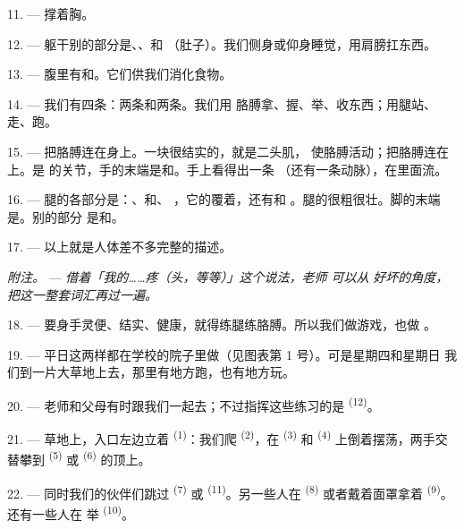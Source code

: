 11. --- 撑着胸。

12. --- 躯干别的部分是、、和
（肚子）。我们侧身或仰身睡觉，用肩膀扛东西。

13. --- 腹里有和。它们供我们消化食物。

\VUsaut{4.4mm}
\VUsaut{3.0mm}

14. --- 我们有四条：两条和两条。我们用
胳膊拿、握、举、收东西；用腿站、走、跑。

15. --- 把胳膊连在身上。一块很结实的，就是二头肌，
使胳膊活动；把胳膊连在上。是
的关节，手的末端是和。手上看得出一条
（还有一条动脉），在里面流。

16. --- 腿的各部分是：、和、
，它的覆着，还有和
。腿的很粗很壮。脚的末端是。别的部分
是和。

17. --- 以上就是人体差不多完整的描述。

\textit{附注。} --- \textit{借着「我的……疼（头，等等）」这个说法，老师
可以从} \textit{好坏的角度，把这一整套词汇再过一遍。}

\VUsaut{5.0mm}
\VUsaut{2.4mm}
\VUsaut{3.0mm}

18. --- 要身手灵便、结实、健康，就得练腿练胳膊。所以我们做游戏，也做
。

19. --- 平日这两样都在学校的院子里做（见图表第 1 号）。可是星期四和星期日
我们到一片大草地上去，那里有地方跑，也有地方玩。

20. --- 老师和父母有时跟我们一起去；不过指挥这些练习的是
 \textsuperscript{(12)}。

21. --- 草地上，入口左边立着 \textsuperscript{(1)}：我们爬
 \textsuperscript{(2)}，在 \textsuperscript{(3)} 和
 \textsuperscript{(4)} 上倒着摆荡，两手交替攀到
\textsuperscript{(5)} 或 \textsuperscript{(6)} 的顶上。

22. --- 同时我们的伙伴们跳过 \textsuperscript{(7)} 或
 \textsuperscript{(11)}。另一些人在 \textsuperscript{(8)}
或者戴着面罩拿着 \textsuperscript{(9)}。还有一些人在
举 \textsuperscript{(10)}。

